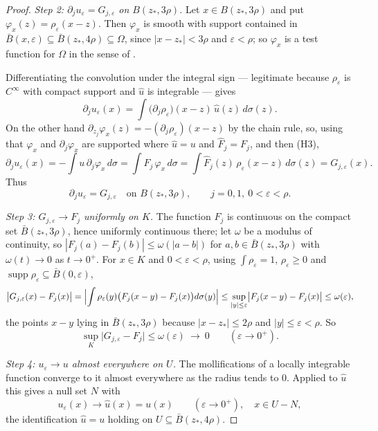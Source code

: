 \begin{proof}
\emph{Step 2: $\partial_ju_\varepsilon=G_{j,\varepsilon}$ on $B(z_*,3\rho)$.}
Let $x\in B(z_*,3\rho)$ and put $\varphi_x(z)=\rho_\varepsilon(x-z)$.  Then
$\varphi_x$ is smooth with support contained in
$\bar B(x,\varepsilon)\subseteq\bar B(z_*,4\rho)\subseteq\Omega$, since
$|x-z_*|<3\rho$ and $\varepsilon<\rho$; so $\varphi_x$ is a test function for
$\Omega$ in the sense of .

Differentiating the convolution under the integral sign --- legitimate because
$\rho_\varepsilon$ is $C^\infty$ with compact support and $\hat u$ is
integrable --- gives
\[
  \partial_ju_\varepsilon(x)
  =\int\bigl(\partial_j\rho_\varepsilon\bigr)(x-z)\,\hat u(z)\,d\sigma(z).
\]
On the other hand $\partial_{z_j}\varphi_x(z)=-(\partial_j\rho_\varepsilon)(x-z)$
by the chain rule, so, using that $\varphi_x$ and $\partial_j\varphi_x$ are
supported where $\hat u=u$ and $\hat F_j=F_j$, and then (H3),
\[
  \partial_ju_\varepsilon(x)
  =-\int u\,\partial_j\varphi_x\,d\sigma
  =\int F_j\,\varphi_x\,d\sigma
  =\int\hat F_j(z)\,\rho_\varepsilon(x-z)\,d\sigma(z)
  =G_{j,\varepsilon}(x).
\]
Thus
\begin{equation}\tag{1}
  \partial_ju_\varepsilon=G_{j,\varepsilon}\quad\text{on }B(z_*,3\rho),
  \qquad j=0,1,\ 0<\varepsilon<\rho .
\end{equation}

\emph{Step 3: $G_{j,\varepsilon}\to F_j$ uniformly on $K$.}  The function $F_j$
is continuous on the compact set $\bar B(z_*,3\rho)$, hence uniformly
continuous there; let $\omega$ be a modulus of continuity, so
$|F_j(a)-F_j(b)|\le\omega(|a-b|)$ for $a,b\in\bar B(z_*,3\rho)$ with
$\omega(t)\to0$ as $t\to0^{+}$.  For $x\in K$ and $0<\varepsilon<\rho$, using
$\int\rho_\varepsilon=1$, $\rho_\varepsilon\ge0$ and
$\operatorname{supp}\rho_\varepsilon\subseteq\bar B(0,\varepsilon)$,
\[
  \bigl|G_{j,\varepsilon}(x)-F_j(x)\bigr|
  =\Bigl|\int\rho_\varepsilon(y)\bigl(F_j(x-y)-F_j(x)\bigr)d\sigma(y)\Bigr|
  \le\sup_{|y|\le\varepsilon}\bigl|F_j(x-y)-F_j(x)\bigr|\le\omega(\varepsilon),
\]
the points $x-y$ lying in $\bar B(z_*,3\rho)$ because $|x-z_*|\le2\rho$ and
$|y|\le\varepsilon<\rho$.  So
\begin{equation}\tag{2}
  \sup_{K}\bigl|G_{j,\varepsilon}-F_j\bigr|\le\omega(\varepsilon)
  \ \longrightarrow\ 0\qquad(\varepsilon\to0^{+}).
\end{equation}

\emph{Step 4: $u_\varepsilon\to u$ almost everywhere on $U$.}  The
mollifications of a locally integrable function converge to it almost
everywhere as the radius tends to $0$.  Applied to $\hat u$ this gives a null
set $N$ with
\begin{equation}\tag{3}
  u_{\varepsilon}(x)\to\hat u(x)=u(x)\qquad(\varepsilon\to0^{+}),
  \quad x\in U-N ,
\end{equation}
the identification $\hat u=u$ holding on $U\subseteq\bar B(z_*,4\rho)$.


\end{proof}
